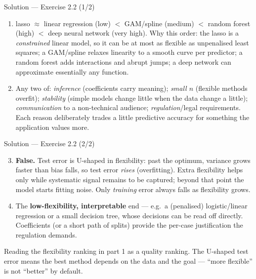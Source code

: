 \documentclass[aspectratio=169,11pt]{beamer}
\begin{document}
\begin{frame}{Solution --- Exercise 2.2 (1/2)}
\begin{solutionbox}
\begin{enumerate}
  \item lasso $\approx$ linear regression (low) $<$ GAM/spline
        (medium) $<$ random forest (high) $<$ deep neural network
        (very high). Why this order: the lasso is a
        \emph{constrained} linear model, so it can be at most as
        flexible as unpenalised least squares; a GAM/spline relaxes
        linearity to a smooth curve per predictor; a random forest
        adds interactions and abrupt jumps; a deep network can
        approximate essentially any function.
  \item Any two of: \emph{inference} (coefficients carry meaning);
        \emph{small $n$} (flexible methods overfit); \emph{stability}
        (simple models change little when the data change a little);
        \emph{communication} to a non-technical audience;
        \emph{regulation}/legal requirements. Each reason deliberately
        trades a little predictive accuracy for something the
        application values more.
\end{enumerate}
\end{solutionbox}
\end{frame}

\begin{frame}{Solution --- Exercise 2.2 (2/2)}
\begin{solutionbox}
\begin{enumerate}\setcounter{enumi}{2}
  \item \textbf{False.} Test error is U-shaped in flexibility: past
        the optimum, variance grows faster than bias falls, so test
        error \emph{rises} (overfitting). Extra flexibility helps only
        while systematic signal remains to be captured; beyond that
        point the model starts fitting noise. Only \emph{training}
        error always falls as flexibility grows.
  \item The \textbf{low-flexibility, interpretable} end --- e.g.\ a
        (penalised) logistic/linear regression or a small decision
        tree, whose decisions can be read off directly. Coefficients
        (or a short path of splits) provide the per-case justification
        the regulation demands.
\end{enumerate}
\end{solutionbox}
\begin{mistake}
Reading the flexibility ranking in part 1 as
a quality ranking. The U-shaped test error means the best method
depends on the data and the goal --- ``more flexible'' is not
``better'' by default.
\end{mistake}
\end{frame}
\end{document}
